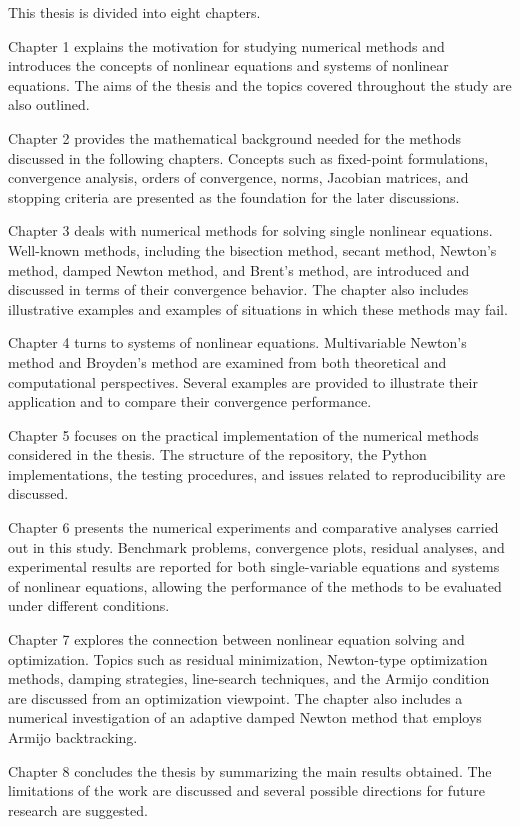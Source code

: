 This thesis is divided into eight chapters.

Chapter 1 explains the motivation for studying numerical methods and introduces the concepts of nonlinear equations and systems of nonlinear equations. The aims of the thesis and the topics covered throughout the study are also outlined.

Chapter 2 provides the mathematical background needed for the methods discussed in the following chapters. Concepts such as fixed-point formulations, convergence analysis, orders of convergence, norms, Jacobian matrices, and stopping criteria are presented as the foundation for the later discussions.

Chapter 3 deals with numerical methods for solving single nonlinear equations. Well-known methods, including the bisection method, secant method, Newton’s method, damped Newton method, and Brent’s method, are introduced and discussed in terms of their convergence behavior. The chapter also includes illustrative examples and examples of situations in which these methods may fail.

Chapter 4 turns to systems of nonlinear equations. Multivariable Newton’s method and Broyden’s method are examined from both theoretical and computational perspectives. Several examples are provided to illustrate their application and to compare their convergence performance.

Chapter 5 focuses on the practical implementation of the numerical methods considered in the thesis. The structure of the repository, the Python implementations, the testing procedures, and issues related to reproducibility are discussed.

Chapter 6 presents the numerical experiments and comparative analyses carried out in this study. Benchmark problems, convergence plots, residual analyses, and experimental results are reported for both single-variable equations and systems of nonlinear equations, allowing the performance of the methods to be evaluated under different conditions.

Chapter 7 explores the connection between nonlinear equation solving and optimization. Topics such as residual minimization, Newton-type optimization methods, damping strategies, line-search techniques, and the Armijo condition are discussed from an optimization viewpoint. The chapter also includes a numerical investigation of an adaptive damped Newton method that employs Armijo backtracking.

Chapter 8 concludes the thesis by summarizing the main results obtained. The limitations of the work are discussed and several possible directions for future research are suggested.